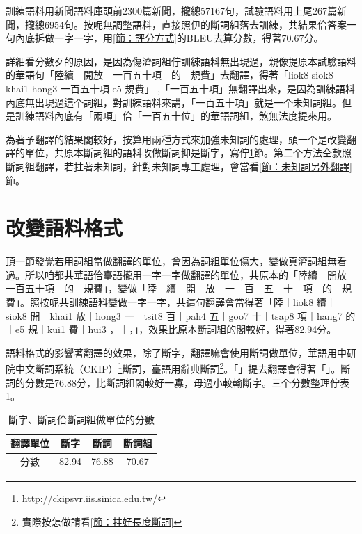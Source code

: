 \documentclass[final,oneside,onecolumn,12pt,a4paper]{book}%
\begin{document}
訓練語料用新聞語料庫頭前2300篇新聞，攏總57167句，試驗語料用上尾267篇新聞，攏總6954句。按呢無調整語料，直接照伊的斷詞組落去訓練，共結果佮答案一句內底拆做一字一字，用\ref{節：評分方式}的BLEU去算分數，得著70.67分。

詳細看分數歹的原因，是因為傷濟詞組佇訓練語料無出現過，親像提原本試驗語料的華語句「陸續　開放　一百五十項　的　規費」去翻譯，得著「liok8-siok8 khai1-hong3 一百五十項 e5 規費」 ,「一百五十項」無翻譯出來，是因為訓練語料內底無出現過這个詞組，對訓練語料來講，「一百五十項」就是一个未知詞組。但是訓練語料內底有「兩項」佮「一百五十位」的華語詞組，煞無法度提來用。

為著予翻譯的結果閣較好，按算用兩種方式來加強未知詞的處理，頭一个是改變翻譯的單位，共原本斷詞組的語料改做斷詞抑是斷字，寫佇\ref{節：改變語料格式}節。第二个方法仝款照斷詞組翻譯，若拄著未知詞，針對未知詞專工處理，會當看\ref{節：未知詞另外翻譯}節。



\section{改變語料格式}
\label{節：改變語料格式}

頂一節發覺若用詞組當做翻譯的單位，會因為詞組單位傷大，變做真濟詞組無看過。所以咱都共華語佮臺語攏用一字一字做翻譯的單位，共原本的「陸續　開放　一百五十項　的　規費」，變做「陸　續　開　放　一　百　五　十　項　的　規　費」。照按呢共訓練語料變做一字一字，共這句翻譯會當得著「陸｜liok8 續｜siok8 開｜khai1 放｜hong3 一｜tsit8 百｜pah4 五｜goo7 十｜tsap8 項｜hang7 的｜e5 規｜kui1 費｜hui3 ，｜，」，效果比原本斷詞組的閣較好，得著82.94分。

語料格式的影響著翻譯的效果，除了斷字，翻譯嘛會使用斷詞做單位，華語用中研院中文斷詞系統（CKIP）\footnote{\url{http://ckipsvr.iis.sinica.edu.tw/}}斷詞，臺語用辭典斷詞\footnote{實際按怎做請看\ref{節：拄好長度斷詞}}。「」提去翻譯會得著「」。斷詞的分數是76.88分，比斷詞組閣較好一寡，毋過小較輸斷字。三个分數整理佇表\ref{表：斷詞組、斷詞、斷字做單位的翻譯分數}。

\begin{table}
\caption{斷字、斷詞佮斷詞組做單位的分數}%
\label{表：斷詞組、斷詞、斷字做單位的翻譯分數}
\centering
\begin{tabular}{c|ccc}
翻譯單位 & 斷字 & 斷詞 & 斷詞組\\
\hline
分數　& 82.94 & 76.88 & 70.67\\
\end{tabular}
\end{table}
\end{document}
